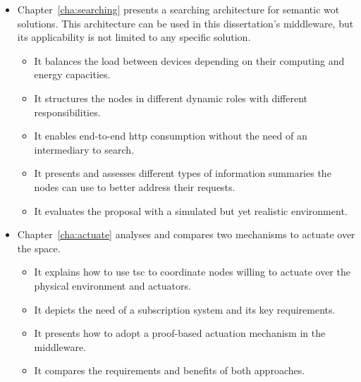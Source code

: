 \begin{itemize}
  \item Chapter~\ref{cha:searching} presents a searching architecture for semantic \ac{wot} solutions.
        This architecture can be used in this dissertation's middleware, but its applicability is not limited to any specific solution.
    \begin{itemize}
      \item It balances the load between devices depending on their computing and energy capacities.
      \item It structures the nodes in different dynamic roles with different responsibilities. %
      \item It enables end-to-end \ac{http} consumption without the need of an intermediary to search. %
      \item It presents and assesses different types of information summaries the nodes can use to better address their requests.
      \item It evaluates the proposal with a simulated but yet realistic environment.
    \end{itemize}
    
  \item Chapter~\ref{cha:actuate} analyses and compares two mechanisms to actuate over the space. %
    \begin{itemize}
      \item It explains how to use \ac{tsc} to coordinate nodes willing to actuate over the physical environment and actuators.
      \item It depicts the need of a subscription system and its key requirements.
      \item It presents how to adopt a proof-based actuation mechanism in the middleware.
      \item It compares the requirements and benefits of both approaches.
    \end{itemize}
  

\end{itemize}
